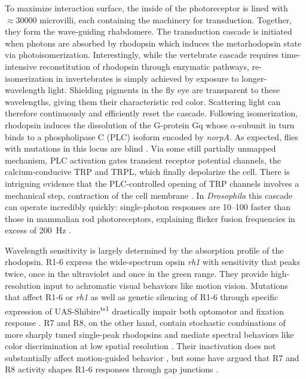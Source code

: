 To maximize interaction surface, the inside of the photoreceptor is lined with $\approx\num{30000}$ microvilli, each containing the machinery for transduction. Together, they form the wave-guiding rhabdomere. The transduction cascade is initiated when photons are absorbed by rhodopsin which induces the metarhodopsin state via photoisomerization. Interestingly, while the vertebrate cascade requires time-intensive reconstitution of rhodopsin through enzymatic pathways, re-isomerization in invertebrates is simply achieved by exposure to longer-wavelength light. Shielding pigments in the fly eye are transparent to these wavelengths, giving them their characteristic red color. Scattering light can therefore continuously and efficiently reset the cascade. Following isomerization, rhodopsin induces the dissolution of the G-protein Gq whose $\alpha$-subunit in turn binds to a phospholipase C (PLC) isoform encoded by \textit{norpA}. As expected, flies with mutations in this locus are blind \citep{Bloomquist:1988aa}. Via some still partially unmapped mechanism, PLC activation gates transient receptor potential channels, the calcium-conducive TRP and TRPL, which finally depolarize the cell. There is intriguing evidence that the PLC-controlled opening of TRP channels involves a mechanical step, contraction of the cell membrane \citep{Hardie:2012aa}. In \textit{Drosophila} this cascade can operate incredibly quickly: single-photon responses are \SIrange{10}{100}{\times} faster than those in mammalian rod photoreceptors, explaining flicker fusion frequencies in excess of \SI{200}{\hertz} \citep{Heisenberg:1984aa}.

Wavelength sensitivity is largely determined by the absorption profile of the rhodopsin. R1-6 express the wide-spectrum opsin \textit{rh1} with sensitivity that peaks twice, once in the ultraviolet and once in the green range. They provide high-resolution input to achromatic visual behaviors like motion vision. Mutations that affect R1-6 or \textit{rh1} as well as genetic silencing of R1-6 through specific expression of UAS-Shibire\textsuperscript{ts1} drastically impair both optomotor and fixation response \citep{Heisenberg:1977aa,OTousa:1985aa,Rister:2007fn}. R7 and R8, on the other hand, contain stochastic combinations of more sharply tuned single-peak rhodopsins \citep{Franceschini:1981aa} and mediate spectral behaviors like color discrimination at low spatial resolution \citep{Schnaitmann:2013aa}. Their inactivation does not substantially affect motion-guided behavior \citep{Yamaguchi:2008aa}, but some have argued that R7 and R8 activity shapes R1-6 responses through gap junctions \citep{Wardill:2012aa}.

